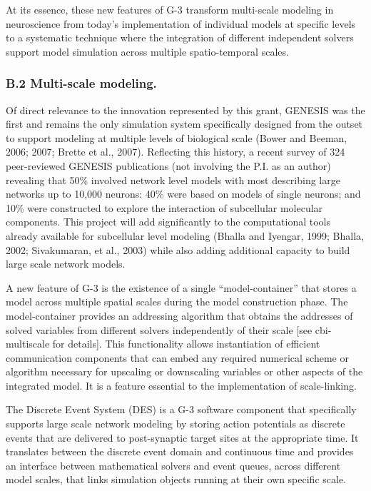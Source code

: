 \documentclass[12pt]{article}
\begin{document}
At its essence, these new
features of G-3 transform multi-scale modeling in
neuroscience from today's implementation of individual models at specific levels to a systematic
technique where the integration of different independent solvers support model simulation across multiple spatio-temporal scales.\\

\subsubsection*{B.2 Multi-scale modeling.}

\noindent Of direct relevance to the innovation represented by this grant,
GENESIS was the first and remains the only simulation system
specifically designed from the outset to support modeling at multiple
levels of biological scale (Bower and Beeman, 2006; 2007; Brette et
al., 2007). Reflecting this history, a recent survey of 324
peer-reviewed GENESIS publications (not involving the P.I. as an
author) revealing that 50\% involved network level models with most
describing large networks up to 10,000 neurons: 40\% were based on
models of single neurons; and 10\% were constructed to explore the
interaction of subcellular molecular components.  This project will
add significantly to the computational tools already available for subcellular level
modeling (Bhalla and Iyengar, 1999; Bhalla, 2002; Sivakumaran, et al.,
2003) while also adding additional capacity to build large scale
network models. 

A new feature of G-3 is the existence of
a single ``model-container'' that stores a model across multiple spatial scales
during the model construction phase.  The model-container provides an addressing algorithm that obtains the addresses of
solved variables from different solvers independently of their
scale [see cbi-multiscale for details].  This functionality
allows instantiation of efficient communication components that can embed any required numerical scheme or algorithm necessary for upscaling or downscaling variables or other aspects of the integrated model.  It is a feature essential to the implementation of scale-linking.

The Discrete Event System (DES) is a G-3 software component  that specifically
 supports large scale network modeling by storing action potentials
as discrete events that are delivered to post-synaptic target sites at the 
appropriate time. It translates between the discrete event domain and 
continuous time and provides an interface between mathematical solvers and event queues, across different model scales, that links simulation objects running at their own specific scale.
\end{document}
